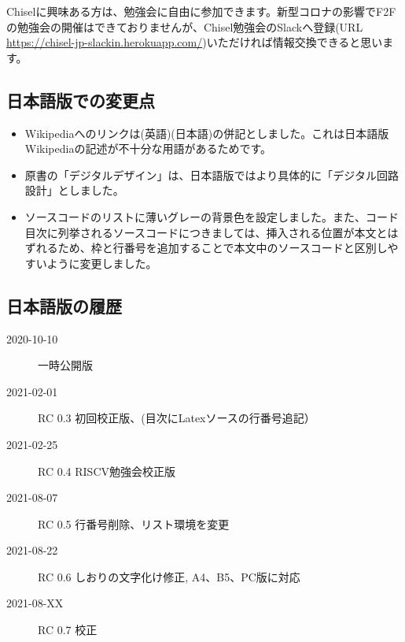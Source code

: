 \documentclass[%
    10pt,
    headinclude, footexclude,
    openright, %
    notitlepage,
    cleardoubleempty,
    headsepline,
    pointlessnumbers,
    bibtotoc, idxtotoc,
    ]{scrbook}
\newif\ifshoworiginal
\newif\ifshowtrans
\begin{document}
\begin{flushleft}
Chiselに興味ある方は、勉強会に自由に参加できます。新型コロナの影響でF2Fの勉強会の開催はできておりませんが、Chisel勉強会のSlackへ登録(URL \url{https://chisel-jp-slackin.herokuapp.com/})いただければ情報交換できると思います。

\subsection*{日本語版での変更点}

\begin{itemize}
    \item Wikipediaへのリンクは(英語)(日本語)の併記としました。これは日本語版Wikipediaの記述が不十分な用語があるためです。
    \item 原書の「デジタルデザイン」は、日本語版ではより具体的に「デジタル回路設計」としました。
    \item ソースコードのリストに薄いグレーの背景色を設定しました。また、コード目次に列挙されるソースコードにつきましては、挿入される位置が本文とはずれるため、枠と行番号を追加することで本文中のソースコードと区別しやすいように変更しました。
\end{itemize}

\subsection*{日本語版の履歴}

\begin{description}
\item[2020-10-10] 一時公開版
\item[2021-02-01] RC 0.3 初回校正版、(目次にLatexソースの行番号追記）
\item[2021-02-25] RC 0.4 RISCV勉強会校正版
\item[2021-08-07] RC 0.5 行番号削除、リスト環境を変更
\item[2021-08-22] RC 0.6 しおりの文字化け修正, A4、B5、PC版に対応
\item[2021-08-XX] RC 0.7 校正
\end{description}

\fi %

\mainmatter

\ifshoworiginal
\chapter{Introduction}
\fi
\ifshowtrans %
\chapter{はじめに} %
\fi


\end{flushleft}
\end{document}
